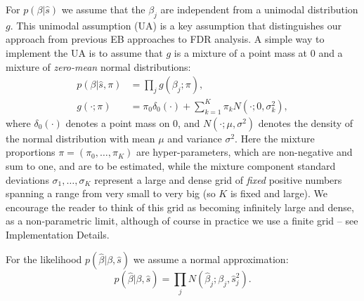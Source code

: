 \documentclass[11pt]{article}
\def\bhat{\hat{\beta}}
\def\shat{\hat{s}}
\begin{document}
For $p(\beta | \shat)$ we assume that the $\beta_j$ are independent from a unimodal distribution $g$.
This unimodal assumption (UA) is a key assumption that distinguishes our approach from previous EB approaches to FDR analysis.
A simple way to implement the UA is to assume that $g$ is
a mixture of a point mass at 0 and a mixture of {\it zero-mean} normal distributions:
\begin{align} \label{eqn:beta}
p(\beta | \shat, \pi) & = \prod_j g(\beta_j; \pi), \\   
g(\cdot; \pi) & = \pi_0 \delta_0(\cdot) + \sum_{k=1}^K \pi_k N(\cdot; 0, \sigma_k^2), \label{eqn:mixnorm}
\end{align}
where $\delta_0(\cdot)$ denotes a point mass on 0, and $N(\cdot; \mu, \sigma^2)$ denotes the density of the normal distribution with mean $\mu$ and variance $\sigma^2$.
Here the mixture proportions $\pi=(\pi_0,\dots,\pi_K)$ are hyper-parameters, which are non-negative and sum to one, and are to be estimated,
while the mixture component standard deviations $\sigma_1,\dots,\sigma_K$ 
represent a large and dense grid of {\it fixed} positive numbers spanning a range from very small to very big (so $K$ is fixed and large). 
We encourage the reader to think of this grid as becoming infinitely large and dense, as a non-parametric limit,
although of course in practice we use a finite grid -- see Implementation Details.

For the likelihood $p(\bhat | \beta, \shat)$ we assume a normal approximation:
\begin{equation} \label{eqn:normlik}
p(\bhat | \beta, \shat) = \prod_j N(\bhat_j; \beta_j, \shat_j^2).
\end{equation}
\end{document}
